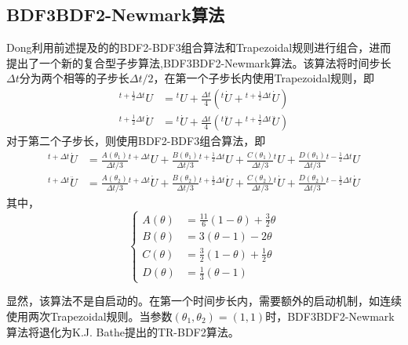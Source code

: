 \subsection{BDF3BDF2-Newmark算法}
Dong利用前述提及的的BDF2-BDF3组合算法和Trapezoidal规则进行组合，进而提出了一个新的复合型子步算法,BDF3BDF2-Newmark算法\cite{Dong2013a}。该算法将时间步长$\Delta t$分为两个相等的子步长$\Delta t/2$，在第一个子步长内使用Trapezoidal规则，即
\begin{align}
{^{t+\frac{1}{2}\Delta t}\!U}&={^t\!U}+\frac{\Delta t}{4}({^{t}\!\dot{U}}+{^{t+\frac12\Delta t}\!\dot{U}})\\
{^{t+\frac{1}{2}\Delta t}\!\dot{U}}&={^t\!\dot{U}}+\frac{\Delta t}{4}({^{t}\!\ddot{U}}+{^{t+\frac12\Delta t}\!\ddot{U}})
\end{align}
对于第二个子步长，则使用BDF2-BDF3组合算法，即
\begin{align}
{^{t+\Delta t}\!\dot{U}}&=\frac{A(\theta_1)}{\Delta t/3}{^{t+\Delta t}\!{U}}+\frac{B(\theta_1)}{\Delta t/3}{^{t+\frac12\Delta t}\!{U}}+\frac{C(\theta_1)}{\Delta t/3}{^{t}\!{U}}+\frac{D(\theta_1)}{\Delta t/3}{^{t-\frac12\Delta t}\!{U}}\\
{^{t+\Delta t}\!\ddot{U}}&=\frac{A(\theta_2)}{\Delta t/3}{^{t+\Delta t}\!\dot{U}}+\frac{B(\theta_2)}{\Delta t/3}{^{t+\frac12\Delta t}\!\dot{U}}+\frac{C(\theta_2)}{\Delta t/3}{^{t}\!\dot{U}}+\frac{D(\theta_2)}{\Delta t/3}{^{t-\frac12\Delta t}\!\dot{U}}
\end{align}
其中，
\begin{equation}
\left\{\begin{aligned}
A(\theta)&=\frac{11}{6}(1-\theta)+\frac32\theta\\
B(\theta)&=3(\theta-1)-2\theta\\
C(\theta)&=\frac{3}{2}(1-\theta)+\frac{1}{2}\theta\\
D(\theta)&=\frac{1}{3}(\theta-1)
\end{aligned}\right.
\end{equation}

显然，该算法不是自启动的。在第一个时间步长内，需要额外的启动机制，如连续使用两次Trapezoidal规则。当参数$(\theta_1,\theta_2)=(1,1)$时，BDF3BDF2-Newmark算法将退化为K.J. Bathe提出的TR-BDF2算法。

